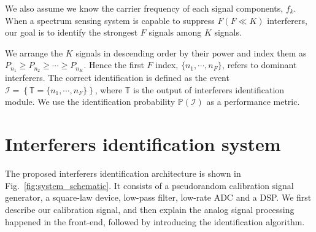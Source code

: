 \documentclass{IEEEtran}
\begin{document}


We also assume we know the carrier frequency of each signal components, $f_{k}$. When a spectrum sensing system is capable to suppress $F (F \ll K)$ interferers, our goal is to identify the strongest $F$ signals among $K$ signals. 
 
We arrange the $K$ signals in descending order by their power and index them as $P_{n_1} \geq P_{n_2} \geq \cdots \geq P_{n_{K}}$. Hence the first $F$ index, $\{n_1,\cdots,n_{F}\}$, refers to dominant interferers. The correct identification is defined as the event $\mathcal{I} = \left\{\mathbb{T}=\{n_1,\cdots,n_{F}\}\right\}$, where $\mathbb{T}$ is the output of interferers identification module. We use the identification probability $\mathbb{P}(\mathcal{I})$ as a performance metric. 

%
%

\section{Interferers identification system}
\label{sec:aigorithm}
The proposed interferers identification architecture is shown in Fig.~\ref{fig:system_schematic}. It consists of a pseudorandom calibration signal generator, a square-law device, low-pass filter, low-rate ADC and a DSP. We first describe our calibration signal, and then explain the analog signal processing happened in the front-end, followed by introducing the identification algorithm.
\end{document}
